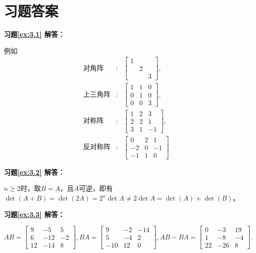 
\section{习题答案}

\textbf{习题\ref{ex:3.1} 解答：}

例如
\begin{eqnarray*}
\text{对角阵} & : & \begin{bmatrix} 1 & & \\ & 2 & \\ & & 3 \end{bmatrix}, \\
\text{上三角阵} & : & \begin{bmatrix} 1 & 1 & 0 \\ 0 & 1 & 0 \\ 0 & 0 & 3 \end{bmatrix}, \\
\text{对称阵} & : & \begin{bmatrix} 1 & 2 & 3\\ 2 & 2 & 1 \\ 3 & 1 & -1 \end{bmatrix}, \\
\text{反对称阵} & : & \begin{bmatrix} 0 & 2 & 1\\ -2 & 0 & -1 \\ -1 & 1 & 0 \end{bmatrix}
\end{eqnarray*}

\vspace{1.5em}

\textbf{习题\ref{ex:3.2} 解答：}

$n \geqslant 2$时，取$B = A$，且$A$可逆，即有$\det(A+B) = \det(2A) = 2^n\det A \neq 2\det A = \det(A)+\det(B)$。

\vspace{1.5em}

\textbf{习题\ref{ex:3.3} 解答：}

$
AB = \begin{bmatrix} 9 & -5 & 5 \\ 6 & -12 & -2 \\ 12 & -14 & 8 \end{bmatrix},
BA = \begin{bmatrix} 9 & -2 & -14 \\ 5 & -4 & 2 \\ -10 & 12 & 0 \end{bmatrix},
AB - BA = \begin{bmatrix} 0 & -3 & 19 \\  1 & -8 & -4 \\ 22 & -26 & 8 \end{bmatrix}.
$

